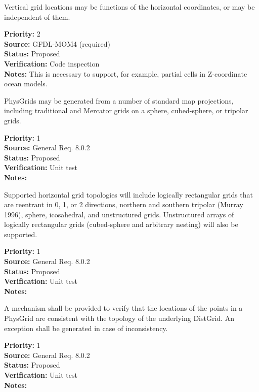 
Vertical grid locations may be functions of the horizontal coordinates, or may be
independent of them.

\begin{reqlist}
{\bf Priority:} 2 \\
{\bf Source:} GFDL-MOM4 (required) \\
{\bf Status:} Proposed \\
{\bf Verification:} Code inspection\\
{\bf Notes:} This is necessary to support, for example, partial cells in
Z-coordinate ocean models.
\end{reqlist}



PhysGrids may be generated from a number of standard map projections,
including traditional and Mercator grids on a sphere, cubed-sphere, or tripolar
grids.
\begin{reqlist}
{\bf Priority:} 1 \\
{\bf Source:} General Req. 8.0.2 \\
{\bf Status:} Proposed \\
{\bf Verification:} Unit test\\
{\bf Notes:}
\end{reqlist}

 Supported horizontal grid topologies will include
logically rectangular grids that are reentrant in 0, 1, or 2 directions,
northern and southern tripolar (Murray 1996), sphere, icosahedral, and
unstructured grids.  Unstructured arrays of logically rectangular grids
(cubed-sphere and arbitrary nesting) will also be supported.
\begin{reqlist}
{\bf Priority:} 1 \\
{\bf Source:} General Req. 8.0.2 \\
{\bf Status:} Proposed \\
{\bf Verification:} Unit test\\
{\bf Notes:}
\end{reqlist}


A mechanism shall be provided to verify that the locations of the points in
a PhysGrid are consistent with the topology of the underlying DistGrid.  An
exception shall be generated in case of inconsistency.
\begin{reqlist}
{\bf Priority:} 1 \\
{\bf Source:} General Req. 8.0.2 \\
{\bf Status:} Proposed \\
{\bf Verification:} Unit test\\
{\bf Notes:}
\end{reqlist}

